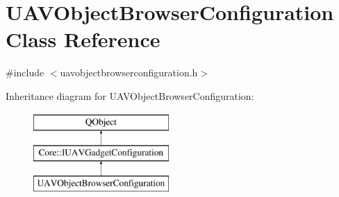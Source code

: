 \hypertarget{class_u_a_v_object_browser_configuration}{\section{U\-A\-V\-Object\-Browser\-Configuration Class Reference}
\label{class_u_a_v_object_browser_configuration}
}


{\ttfamily \#include $<$uavobjectbrowserconfiguration.\-h$>$}

Inheritance diagram for U\-A\-V\-Object\-Browser\-Configuration\-:\begin{figure}[H]
\begin{center}
\leavevmode
\includegraphics[height=3.000000cm]{class_u_a_v_object_browser_configuration}
\end{center}
\end{figure}
